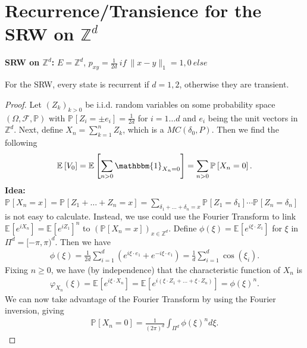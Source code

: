 \section{Recurrence/Transience for the SRW on $\mathbb{Z}^d$}
\textbf{SRW on $\mathbb{Z}^d$:} $E=\mathbb{Z}^d$, $p_{xy}=\frac{1}{2d}\ if\ \|x-y\|_1=1, 0\ else$ 

\begin{theorem}[Polya]
	For the SRW, every state is recurrent if $d=1,2$, otherwise they are transient.
\end{theorem}
\begin{proof}
	Let $(Z_k)_{k> 0}$ be i.i.d. random variables on some probability space $(\Omega, \mathcal{F}, \mathbb{P})$ with $\mathbb{P}_{} \left[ Z_i = \pm e_i \right] = \frac{1}{2d}$ for $i= 1 \ldots d$ and $e_i$ being the unit vectors in $\mathbb{Z}^{d}$. Next, define $X_n = \sum_{k=1}^{n} Z_k$, which is a $MC(\delta_0, P)$. Then we find the following
	\begin{align}
		\mathbb{E}_{} \left[ V_0 \right] = \mathbb{E}_{} \left[ \sum_{n> 0}^{} \mathbbm{1}_{X_n =0}  \right] = \sum_{n> 0}^{} \mathbb{P}_{} \left[ X_n = 0 \right] .
	\end{align}
	\textbf{Idea:} $\mathbb{P}_{} \left[ X_n=x \right]  = \mathbb{P}_{} \left[ Z_1+ \ldots + Z_n = x \right] = \sum_{\delta_1 + \ldots + \delta_n =x}^{} \mathbb{P}_{} \left[ Z_1 = \delta_1 \right] \cdots \mathbb{P}_{} \left[ Z_n = \delta_n \right]  $ is not easy to calculate. Instead, we use could use the Fourier Transform to link $\mathbb{E}_{} \left[ e^{i X_n} \right] = \mathbb{E}_{} \left[ e^{iZ_1} \right] ^n $ to $(\mathbb{P}_{} \left[ X_n =x\right] )_{x \in \mathbb{Z}^d}$.
	Define $\phi(\xi) = \mathbb{E}_{} \left[ e^{i \xi \cdot Z_1} \right] $ for $\xi$ in $\Pi^d = [-\pi, \pi)^d$. Then we have
	\begin{align}
		\phi(\xi) = \frac{1}{2d} \sum_{i=1}^{d} (e^{i \xi \cdot e_1} + e^{-i \xi \cdot e_1}) = \frac{1}{d} \sum_{i=1}^{d} \cos(\xi_i)
	.\end{align}
	Fixing $n\geq 0$, we have (by independence) that the characteristic function of $X_n$ is 
	\begin{align}
		\varphi_{X_n}(\xi) = \mathbb{E}_{} \left[ e^{i \xi \cdot X_n} \right]  = \mathbb{E}_{} \left[ e ^{i ( \xi \cdot Z_1 + \ldots + \xi \cdot Z_n)} \right] = \phi(\xi)^n. 	
	\end{align}
	{\color{blue}We can now take advantage of the Fourier Transform by }using the Fourier inversion, giving
\begin{align}
	\mathbb{P}_{} \left[ X_n = 0 \right] = \frac{1}{(2 \pi) ^d} \int_{\Pi^d}^{} \phi(\xi)^n d\xi.

\end{align}
\end{proof}
